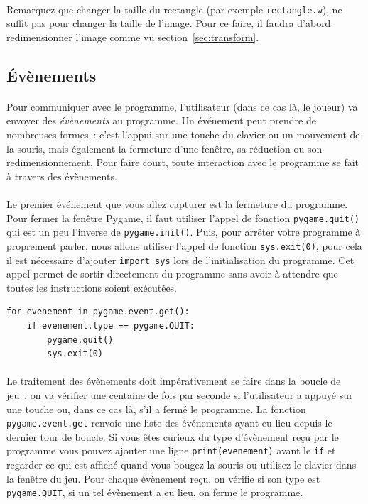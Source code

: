 \paragraph{}
Remarquez que changer la taille du rectangle (par exemple \texttt{rectangle.w}), ne suffit pas pour changer la taille de l'image.
Pour ce faire, il faudra d'abord redimensionner l'image comme vu section~\ref{sec:transform}.

\subsection{Évènements}
\label{sec:evenements}

\paragraph{}
Pour communiquer avec le programme, l'utilisateur (dans ce cas là, le joueur) va envoyer des \emph{évènements} au programme.
Un événement peut prendre de nombreuses formes~: c'est l'appui sur une touche du clavier ou un mouvement de la souris, mais également la fermeture d'une fenêtre, sa réduction ou son redimensionnement.
Pour faire court, toute interaction avec le programme se fait à travers des évènements.

\paragraph{}
Le premier événement que vous allez capturer est la fermeture du programme.
Pour fermer la fenêtre Pygame, il faut utiliser l'appel de fonction \texttt{pygame.quit()} qui est un peu l'inverse de \texttt{pygame.init()}.
Puis, pour arrêter votre programme à proprement parler, nous allons utiliser l'appel de fonction \texttt{sys.exit(0)}, pour cela il est nécessaire d'ajouter \texttt{import sys} lors de l'initialisation du programme.
Cet appel permet de sortir directement du programme sans avoir à attendre que toutes les instructions soient exécutées.
\begin{verbatim}
for evenement in pygame.event.get():
    if evenement.type == pygame.QUIT:
        pygame.quit()
        sys.exit(0)
\end{verbatim}

\paragraph{}
Le traitement des évènements doit impérativement se faire dans la boucle de jeu~: on va vérifier une centaine de fois par seconde si l'utilisateur a appuyé sur une touche ou, dans ce cas là, s'il a fermé le programme.
La fonction \texttt{pygame.event.get} renvoie une liste des événements ayant eu lieu depuis le dernier tour de boucle.
Si vous êtes curieux du type d'évènement reçu par le programme vous pouvez ajouter une ligne \texttt{print(evenement)} avant le \texttt{if} et regarder ce qui est affiché quand vous bougez la souris ou utilisez le clavier dans la fenêtre du jeu.
Pour chaque évènement reçu, on vérifie si son type est \texttt{pygame.QUIT}, si un tel évènement a eu lieu, on ferme le programme.

